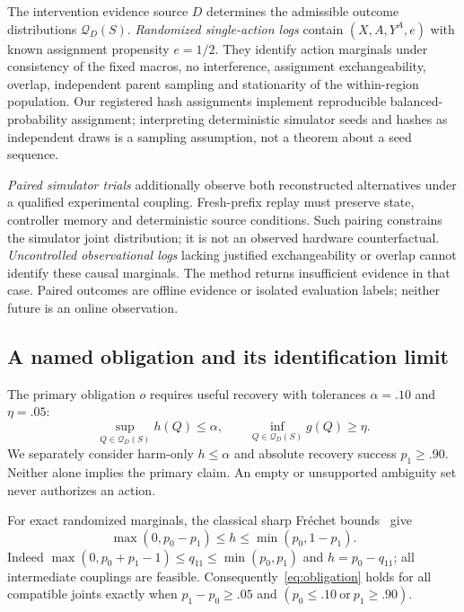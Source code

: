 \documentclass[conference]{IEEEtran}
\newcommand{\Q}{\mathcal{Q}}
\begin{document}
The intervention evidence source $D$ determines the admissible outcome distributions $\Q_D(S)$. \emph{Randomized single-action logs} contain $(X,A,Y^A,e)$ with known assignment propensity $e=1/2$. They identify action marginals under consistency of the fixed macros, no interference, assignment exchangeability, overlap, independent parent sampling and stationarity of the within-region population. Our registered hash assignments implement reproducible balanced-probability assignment; interpreting deterministic simulator seeds and hashes as independent draws is a sampling assumption, not a theorem about a seed sequence.

\emph{Paired simulator trials} additionally observe both reconstructed alternatives under a qualified experimental coupling. Fresh-prefix replay must preserve state, controller memory and deterministic source conditions. Such pairing constrains the simulator joint distribution; it is not an observed hardware counterfactual. \emph{Uncontrolled observational logs} lacking justified exchangeability or overlap cannot identify these causal marginals. The method returns insufficient evidence in that case. Paired outcomes are offline evidence or isolated evaluation labels; neither future is an online observation.

\subsection{A named obligation and its identification limit}
The primary obligation $o$ requires useful recovery with tolerances $\alpha=.10$ and $\eta=.05$:
\begin{equation}
 \sup_{Q\in\Q_D(S)}h(Q)\leq\alpha,\qquad
 \inf_{Q\in\Q_D(S)}g(Q)\geq\eta.\label{eq:obligation}
\end{equation}
We separately consider harm-only $h\leq\alpha$ and absolute recovery success $p_1\geq .90$. Neither alone implies the primary claim. An empty or unsupported ambiguity set never authorizes an action.

For exact randomized marginals, the classical sharp Fr\'echet bounds~\cite{kallus2022} give
\begin{equation}
 \max(0,p_0-p_1)\leq h\leq\min(p_0,1-p_1).\label{eq:sharp}
\end{equation}
Indeed $\max(0,p_0+p_1-1)\leq q_{11}\leq\min(p_0,p_1)$ and $h=p_0-q_{11}$; all intermediate couplings are feasible. Consequently~\eqref{eq:obligation} holds for all compatible joints exactly when $p_1-p_0\geq .05$ and $(p_0\leq .10\ \text{or}\ p_1\geq .90)$.
\end{document}

